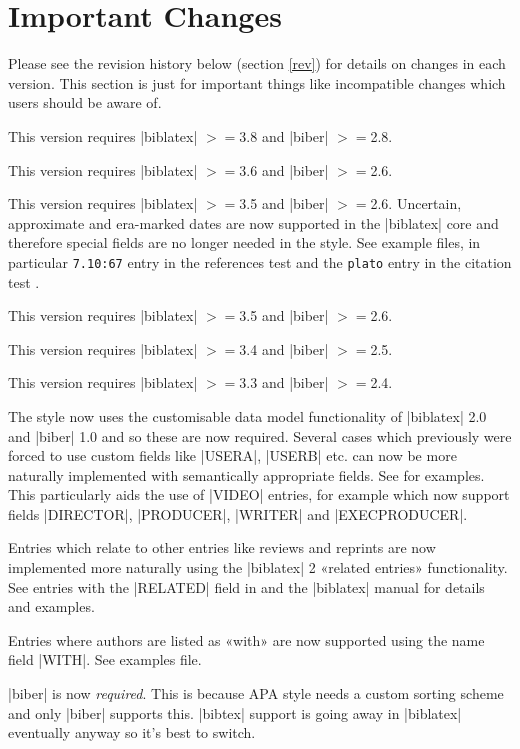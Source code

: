 \documentclass{ltxdockit}
\begin{document}
\printtitlepage
\tableofcontents

\section{Important Changes}\label{special}

Please see the revision history below (section \ref{rev}) for  details on changes in each
version. This section is just for important things like incompatible
changes which users should be aware of.

This version requires |biblatex| $>=$3.8 and |biber| $>=$2.8.

This version requires |biblatex| $>=$3.6 and |biber| $>=$2.6.

This version requires |biblatex| $>=$3.5 and |biber| $>=$2.6. Uncertain,
approximate and era-marked dates are now supported in the |biblatex| core
and therefore special fields are no longer needed in the style. See example
files, in particular \texttt{7.10:67} entry in the references test
 and the \texttt{plato} entry in the citation test .

This version requires |biblatex| $>=$3.5 and |biber| $>=$2.6.

This version requires |biblatex| $>=$3.4 and |biber| $>=$2.5.

This version requires |biblatex| $>=$3.3 and |biber| $>=$2.4.

The style now uses the customisable data model functionality of |biblatex|
2.0 and |biber| 1.0 and so these are now required. Several cases
which previously were forced to use custom fields like |USERA|,
|USERB| etc. can now be more naturally implemented with semantically
appropriate fields. See  for
examples. This particularly aids the use of |VIDEO| entries, for
example which now support fields |DIRECTOR|, |PRODUCER|,
|WRITER| and |EXECPRODUCER|.

Entries which relate to other entries like reviews and reprints are
now implemented more naturally using the |biblatex| 2 «related
entries» functionality. See entries with the |RELATED| field in
 and the |biblatex| manual for
details and examples.

Entries where authors are listed as «with» are now supported using the
name field |WITH|. See examples file.

|biber| is now \emph{required}. This is because APA style needs a custom
sorting scheme and only |biber| supports this. |bibtex| support is going
away in |biblatex| eventually anyway so it's best to switch.
\end{document}
